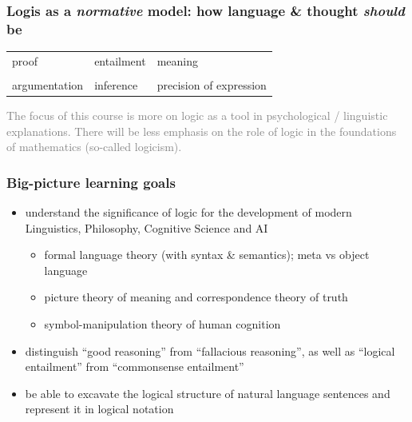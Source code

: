 \documentclass[fleqn,10pt,serif,xcolor=svgnames,xcolor=table,aspectratio=169,handout]{beamer}
\newcommand{\mygray}[1]{\textcolor{gray}{#1}}
\begin{document}
\begin{frame}
  \frametitle{Logis as a \textit{normative} model: how language \& thought \textit{should} be}

  \begin{center}
    \begin{Large}
      \begin{tabular}{C{4cm}C{4cm}C{4cm}}
        proof & entailment & meaning \\
              & \\
        argumentation & inference & precision of expression
      \end{tabular}
    \end{Large}
  \end{center}


  \bigskip

  \begin{center}
    \begin{footnotesize}
      \mygray{The focus of this course is more on logic as a tool in psychological / linguistic explanations. There will be less emphasis on the role of logic in the foundations of mathematics (so-called logicism).}
    \end{footnotesize}
  \end{center}


\end{frame}

\begin{frame}
  \frametitle{Big-picture learning goals}
  \begin{itemize}
    \item understand the significance of logic for the development of modern Linguistics, Philosophy, Cognitive Science and AI
    \begin{itemize}
      \item formal language theory (with syntax \& semantics); meta vs object language
      \item picture theory of meaning and correspondence theory of truth
      \item symbol-manipulation theory of human cognition
    \end{itemize}
    \item distinguish ``good reasoning'' from ``fallacious reasoning'', as well as ``logical entailment'' from ``commonsense entailment''
    \item be able to excavate the logical structure of natural language sentences and represent it in logical notation
  \end{itemize}
\end{frame}
\end{document}
